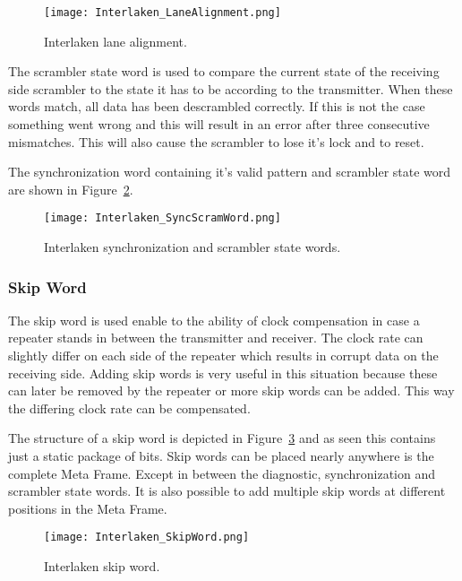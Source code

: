 	\begin{figure}[H]
		\centering
		\texttt{[image: Interlaken\_LaneAlignment.png]}	
		\caption{Interlaken lane alignment.}
		\label{Fig:Interlaken_LaneAlignment}
	\end{figure}
	
	The scrambler state word is used to compare the current state of the receiving side scrambler to the state it has to be according to the transmitter. When these words match, all data has been descrambled correctly. If this is not the case something went wrong and this will result in an error after three consecutive mismatches. This will also cause the scrambler to lose it's lock and to reset.
	
	The synchronization word containing it's valid pattern and scrambler state word are shown in Figure~\ref{Fig:Interlaken_SyncScramWords}.
	
	\begin{figure}[H]
		\centering
		\texttt{[image: Interlaken\_SyncScramWord.png]}	
		\caption{Interlaken synchronization and scrambler state words.}
		\label{Fig:Interlaken_SyncScramWords}
	\end{figure}
	
	\subsubsection{Skip Word}
	The skip word is used enable to the ability of clock compensation in case a repeater stands in between the transmitter and receiver. The clock rate can slightly differ on each side of the repeater which results in corrupt data on the receiving side. Adding skip words is very useful in this situation because these can later be removed by the repeater or more skip words can be added. This way the differing clock rate can be compensated. 
	
	The structure of a skip word is depicted in Figure~\ref{Fig:Interlaken_SkipWord} and as seen this contains just a static package of bits. Skip words can be placed nearly anywhere is the complete Meta Frame. Except in between the diagnostic, synchronization and scrambler state words. It is also possible to add multiple skip words at different positions in the Meta Frame.
	
	\begin{figure}[H]
		\centering
		\texttt{[image: Interlaken\_SkipWord.png]}	
		\caption{Interlaken skip word.}
		\label{Fig:Interlaken_SkipWord}
	\end{figure}
	

